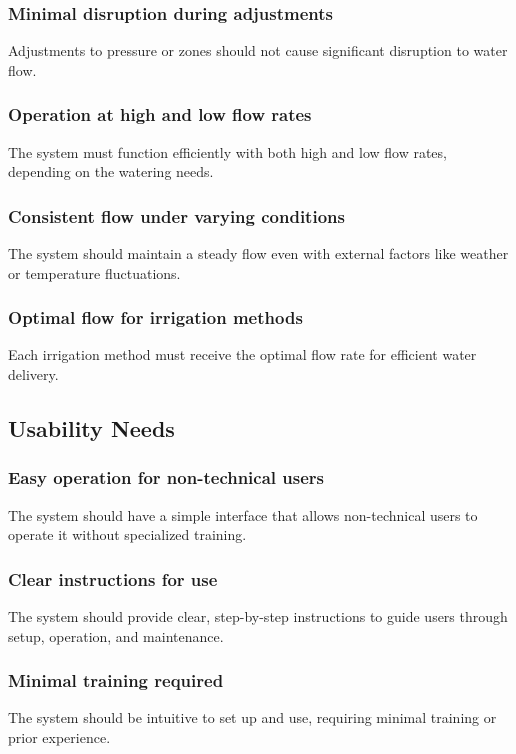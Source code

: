 \documentclass[11pt]{article}
\begin{document}
\subsubsection{Minimal disruption during adjustments}
Adjustments to pressure or zones should not cause significant disruption to water flow.

\subsubsection{Operation at high and low flow rates}
The system must function efficiently with both high and low flow rates, depending on the watering needs.

\subsubsection{Consistent flow under varying conditions}
The system should maintain a steady flow even with external factors like weather or temperature fluctuations.

\subsubsection{Optimal flow for irrigation methods}
Each irrigation method must receive the optimal flow rate for efficient water delivery.

\newpage
\subsection{Usability Needs}

\subsubsection{Easy operation for non-technical users}
The system should have a simple interface that allows non-technical users to operate it without specialized training.

\subsubsection{Clear instructions for use}
The system should provide clear, step-by-step instructions to guide users through setup, operation, and maintenance.

\subsubsection{Minimal training required}
The system should be intuitive to set up and use, requiring minimal training or prior experience.
\end{document}
